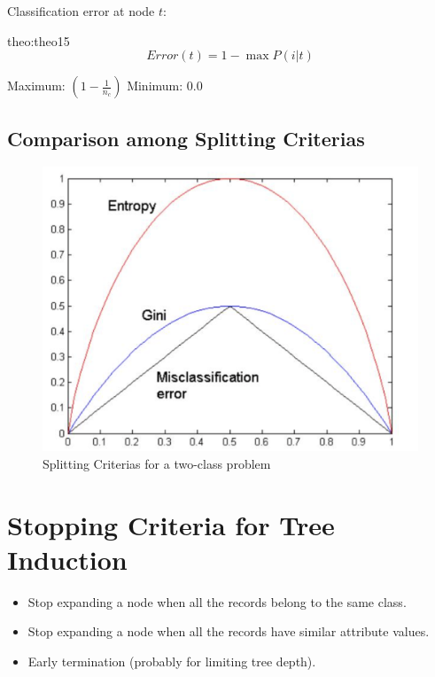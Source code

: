 Classification error at node $t$:

\bigskip
\begin{theo}{theo:theo15}
    \label{eq:classificationerror}
        \[
            Error(t) = 1-\max P(i|t)
        \]
        \begin{center}
            Maximum: $(1-\frac{1}{n_c})$ \qquad\qquad Minimum: $0.0$
        \end{center}
\end{theo}

\subsection{Comparison among Splitting Criterias}

\bigskip
\begin{figure}[H]
    \centering
    \includegraphics[scale=0.5]{figures/splittingcomparison.png}
    \caption{Splitting Criterias for a two-class problem}
\end{figure}

\section{Stopping Criteria for Tree Induction}
\begin{itemize}
    \item Stop expanding a node when all the records belong to the same class.
    \item Stop expanding a node when all the records have similar attribute values.
    \item Early termination (probably for limiting tree depth).
\end{itemize}

